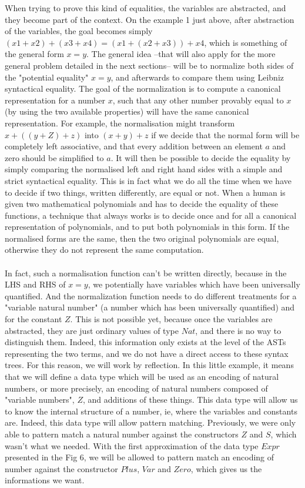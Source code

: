 When trying to prove this kind of equalities, the variables are abstracted, and they become part of the context. On the example 1 just above, after abstraction of the variables, the goal becomes simply $(x1 + x2) + (x3 + x4) = (x1 + (x2 + x3)) + x4$, which is something of the general form $x=y$.
The general idea --that will also apply for the more general problem detailed in the next sections-- will be to normalize both sides of the "potential equality" $x=y$, and afterwards to compare them using Leibniz syntactical equality.
The goal of the normalization is to compute a canonical representation for a number $x$, such that any other number provably equal to $x$ (by using the two available properties) will have the same canonical representation. For example, the normalisation might transform $x+((y+Z)+z)$ into $(x+y)+z$ if we decide that the normal form will be completely left associative, and that every addition between an element $a$ and zero should be simplified to $a$. It will then be possible to decide the equality by simply comparing the normalised left and right hand sides with a simple and strict syntactical equality. This is in fact what we do all the time when we have to decide if two things, written differently, are equal or not. When a human is given two mathematical polynomials and has to decide the equality of these functions, a technique that always works is to decide once and for all a canonical representation of polynomials, and to put both polynomials in this form. If the normalised forms are the same, then the two original polynomials are equal, otherwise they do not represent the same computation.\\
\\
In fact, such a normalisation function can't be written directly, because in the LHS and RHS of $x=y$, we potentially have variables which have been universally quantified. And the normalization function needs to do different treatments for a "variable natural number" (a number which has been universally quantified) and for the constant $Z$. This is not possible yet, because once the variables are abstracted, they are just ordinary values of type $Nat$, and there is no way to distinguish them. Indeed, this information only exists at the level of the ASTs representing the two terms, and we do not have a direct access to these syntax trees.
For this reason, we will work by reflection. In this little example, it means that we will define a data type which will be used as an encoding of natural numbers, or more precisely, an encoding of natural numbers composed of "variable numbers", $Z$, and additions of these things. This data type will allow us to know the internal structure of a number, ie, where the variables and constants are.
Indeed, this data type will allow pattern matching. Previously, we were only able to pattern match a natural number against the constructors $Z$ and $S$, which wasn't what we needed.  With the first approximation of the data type $Expr$ presented in the Fig 6, we will be allowed to pattern match an encoding of number against the constructor $Plus$, $Var$ and $Zero$, which gives us the informations we want.


